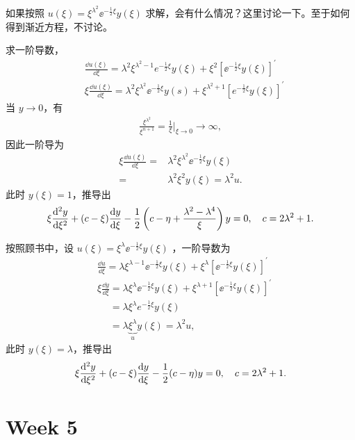 如果按照 $u(\xi) = \xi^{\lambda^2} \ee^{-\frac12\xi}y(\xi)$ 求解，会有什么情况？这里讨论一下。至于如何得到渐近方程，不讨论。

求一阶导数，
\begin{align}
    &\frac{\dd u(\xi)}{\dd \xi}=\lambda^2 \xi^{\lambda^2-1} e^{-\frac{1}{2} \xi} y(\xi)+\xi^2\left[\ee^{-\frac{1}{2} \xi} y(\xi)\right]^{\prime} \\
    &\xi \frac{\dd u(\xi)}{\dd \xi}=\lambda^2 \xi^{\lambda^2} \ee^{-\frac{1}{2} \xi} y(s)+\xi^{\lambda^2+1}\left[e^{-\frac{1}{2} \xi} y(\xi)\right]^{\prime}
\end{align}
当 $y\rightarrow0$，有
\begin{align}
    \frac{\xi^{\lambda^2}}{\xi^{n+1}}=\frac{1}{\xi}\Big|_{\xi \rightarrow 0} \rightarrow \infty,
\end{align}
因此一阶导为
\begin{align}
    \xi \frac{\dd u(\xi)}{\dd \xi}={}& \lambda^2 \xi^{\lambda^2} \ee^{-\frac{1}{2} \xi} y(\xi) \\
    ={}&\lambda^2 \xi^2 y(\xi)=\lambda^2 u. 
\end{align}
此时 $y(\xi) = 1$，推导出
\begin{align}
    \xi \dv[2]{y}{\xi} + (c-\xi) \dv{y}{\xi} - \frac12\left(
        c - \eta + \frac{\lambda^2 - \lambda^4}{\xi}    \right) y = 0, \quad c = 2\lambda^2 + 1. 
\end{align}

按照顾书中，设 $u(\xi) = \xi^{\lambda} \ee^{-\frac12\xi}y(\xi)$ ，一阶导数为
\begin{align}
    &\frac{\dd u}{\dd \xi}=\lambda \xi^{\lambda-1} \ee^{-\frac{1}{2} \xi} y(\xi)+\xi^\lambda\left[\ee^{-\frac{1}{2} \xi} y(\xi)\right]^{\prime} \\
    &\xi \frac{\dd y}{\dd \xi}=\lambda \xi^\lambda \ee^{-\frac{1}{2} \xi} y(\xi)+\xi^{\lambda+1}\left[\ee^{-\frac{1}{2} \xi} y(\xi)\right]^{\prime}\\
    &\phantom{\xi \frac{\dd y}{\dd \xi}}=\lambda \xi^\lambda e^{-\frac{1}{2} \xi} y(\xi) \\
    &\phantom{\xi \frac{\dd y}{\dd \xi}}=\lambda \underbrace{\xi^\lambda}_{u} y(\xi)=\lambda^2 u,
\end{align}
此时 $y(\xi) = \lambda$，推导出
\begin{align}
    \xi \dv[2]{y}{\xi} + (c-\xi) \dv{y}{\xi} - \frac12 (c-\eta) y = 0,
    \quad c = 2\lambda^2 + 1. 
\end{align}

\section{Week 5}
